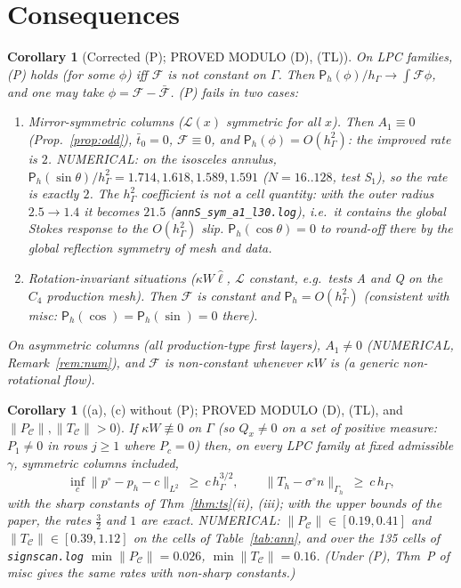 \documentclass[11pt,reqno]{amsart}
\theoremstyle{plain}
\newtheorem{corollary}[theorem]{Corollary}
\theoremstyle{definition}
\newcommand{\hG}{h_\Gamma}
\newcommand{\Gh}{\Gamma_h}
\newcommand{\norm}[1]{\lVert #1\rVert}
\newcommand{\Pm}{\mathsf P_h}
\newcommand{\Lc}{\mathcal L}
\newcommand{\Cc}{\mathcal C}
\begin{document}
\section{Consequences}

\begin{corollary}[Corrected (P); PROVED MODULO (D), (TL)]\label{cor:P}
On LPC families, (P) holds (for some $\phi$) \emph{iff} $\mathcal F$ is not constant on $\Gamma$. Then $\Pm(\phi)/\hG\to\int\mathcal F\phi$, and one may take $\phi=\mathcal F-\bar{\mathcal F}$. (P) fails in two cases:
\begin{enumerate}
\item \emph{Mirror-symmetric columns} ($\Lc(x)$ symmetric for all $x$). Then $A_1\equiv0$ (Prop.~\ref{prop:odd}), $\bar t_0=0$, $\mathcal F\equiv0$, and $\Pm(\phi)=O(\hG^2)$: the improved rate is $2$. NUMERICAL: on the isosceles annulus, $\Pm(\sin\theta)/\hG^2=1.714,1.618,1.589,1.591$ ($N=16..128$, test S$_1$), so the rate is exactly $2$. The $\hG^2$ coefficient is \emph{not} a cell quantity: with the outer radius $2.5\to1.4$ it becomes $21.5$ (\texttt{annS\_sym\_a1\_l30.log}), i.e.\ it contains the global Stokes response to the $O(\hG^2)$ slip. $\Pm(\cos\theta)=0$ to round-off there by the global reflection symmetry of mesh and data.
\item \emph{Rotation-invariant situations} ($\kappa W\hat\ell$, $\Lc$ constant, e.g.\ tests A and Q on the $C_4$ production mesh). Then $\mathcal F$ is constant and $\Pm=O(\hG^2)$ (consistent with misc: $\Pm(\cos)=\Pm(\sin)=0$ there).
\end{enumerate}
On asymmetric columns (all production-type first layers), $A_1\ne0$ (NUMERICAL, Remark~\ref{rem:num}), and $\mathcal F$ is non-constant whenever $\kappa W$ is (a generic non-rotational flow).
\end{corollary}

\begin{corollary}[(a), (c) without (P); PROVED MODULO (D), (TL), and $\norm{P_\Cc},\norm{T_\Cc}>0$]\label{cor:ac}
If $\kappa W\not\equiv0$ on $\Gamma$ (so $Q_x\ne0$ on a set of positive measure: $P_1\ne0$ in rows $j\ge1$ where $P_c=0$) then, on every LPC family at fixed admissible $\gamma$, symmetric columns included,
\[
\inf_c\norm{p^\circ-p_h-c}_{L^2}\ \ge\ c\,\hG^{3/2},\qquad \norm{T_h-\sigma^\circ n}_{\Gh}\ \ge\ c\,\hG,
\]
with the sharp constants of Thm~\ref{thm:ts}(ii), (iii); with the upper bounds of the paper, the rates $\frac32$ and $1$ are exact. NUMERICAL: $\norm{P_\Cc}\in[0.19,0.41]$ and $\norm{T_\Cc}\in[0.39,1.12]$ on the cells of Table~\ref{tab:ann}, and over the 135 cells of \texttt{signscan.log} $\min\norm{P_\Cc}=0.026$, $\min\norm{T_\Cc}=0.16$. (Under (P), Thm~P of misc gives the same rates with non-sharp constants.)
\end{corollary}
\end{document}
